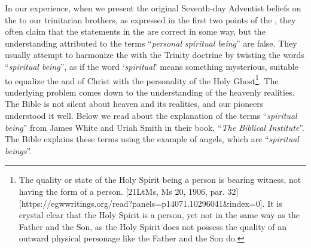 In our experience, when we present the original Seventh-day Adventist beliefs on the  to our trinitarian brothers, as expressed in the first two points of the , they often claim that the statements in the  are correct in some way, but the understanding attributed to the terms “\textit{personal spiritual being}” are false. They usually attempt to harmonize the  with the Trinity doctrine by twisting the words “\textit{spiritual being}”, as if the word ‘\textit{spiritual}’ means something mysterious, suitable to equalize the  and of Christ with the personality of the Holy Ghost\footnote{The quality or state of the Holy Spirit being a person is bearing witness, not having the form of a person. [21LtMs, Ms 20, 1906, par. 32][https://egwwritings.org/read?panels=p14071.10296041&index=0]. It is crystal clear that the Holy Spirit is a person, yet not in the same way as the Father and the Son, as the Holy Spirit does not possess the quality of an outward physical personage like the Father and the Son do.}. The underlying problem comes down to the understanding of the heavenly realities. The Bible is not silent about heaven and its realities, and our pioneers understood it well. Below we read about the explanation of the terms “\textit{spiritual being}” from James White and Uriah Smith in their book, “\textit{The Biblical Institute}”. The Bible explains these terms using the example of angels, which are “\textit{spiritual beings}”.


